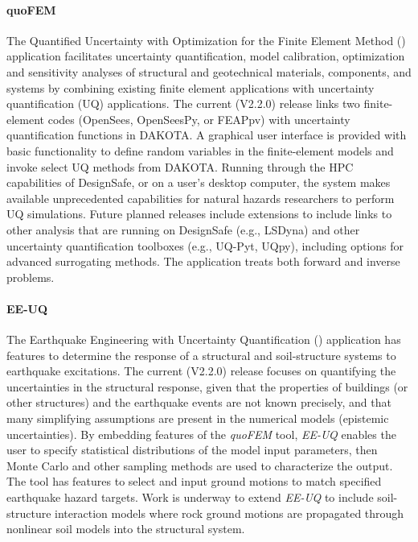 \paragraph{quoFEM}  The Quantified Uncertainty with Optimization for the Finite Element Method () application facilitates uncertainty quantification, model calibration, optimization and sensitivity analyses of structural and geotechnical materials, components, and systems by combining existing finite element applications with uncertainty quantification (UQ) applications. The current (V2.2.0) release links two finite-element codes (OpenSees, OpenSeesPy, or FEAPpv) with uncertainty quantification functions in DAKOTA. A graphical user interface is provided with basic functionality to define random variables in the finite-element models and invoke select UQ methods from DAKOTA. Running through the HPC capabilities of DesignSafe, or on a user’s desktop computer, the system makes available unprecedented capabilities for natural hazards researchers to perform UQ simulations. Future planned releases include extensions to include links to other analysis that are running on DesignSafe (e.g., LSDyna) and other uncertainty quantification toolboxes (e.g., UQ-Pyt, UQpy), including options for advanced surrogating methods. The application treats both forward and inverse problems.

\paragraph{EE-UQ} The Earthquake Engineering with Uncertainty Quantification () application has features to determine the response of a structural and soil-structure systems to earthquake excitations. The current (V2.2.0) release focuses on quantifying the uncertainties in the structural response, given that the properties of buildings (or other structures) and the earthquake events are not known precisely, and that many simplifying assumptions are present in the numerical models (epistemic uncertainties).  By embedding features of the \emph{quoFEM} tool, \emph{EE-UQ} enables the user to specify statistical distributions of the model input parameters, then Monte Carlo and other sampling methods are used to characterize the output. The tool has features to select and input ground motions to match specified earthquake hazard targets. Work is underway to extend \emph{EE-UQ} to include soil-structure interaction models where rock ground motions are propagated through nonlinear soil models into the structural system.

